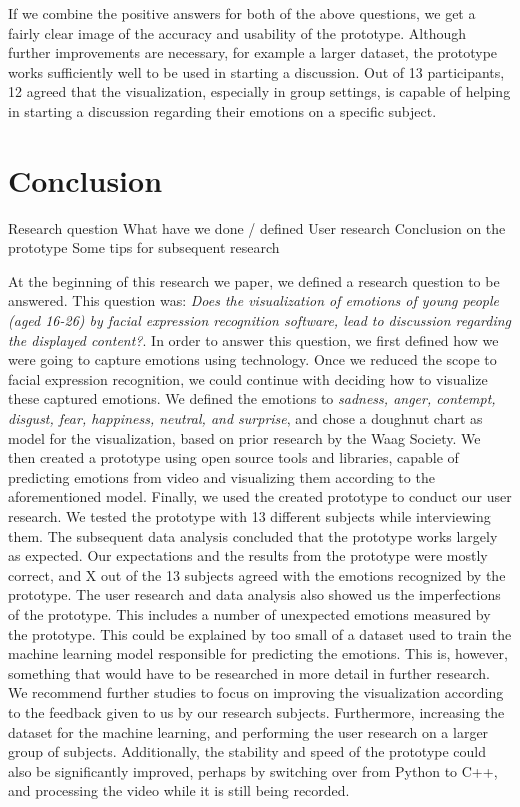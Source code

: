 \documentclass[sigconf]{acmart}
\begin{document}
If we combine the positive answers for both of the above questions, we get a fairly clear image of the accuracy
and usability of the prototype. Although further improvements are necessary, for example a larger dataset,
the prototype works sufficiently well to be used in starting a discussion. Out of 13 participants, 12 agreed that
the visualization, especially in group settings, is capable of helping in starting a discussion regarding their
emotions on a specific subject.


\section{Conclusion}
Research question
What have we done / defined
User research
Conclusion on the prototype
Some tips for subsequent research

At the beginning of this research we paper, we defined a research question to be answered. This question was:
\emph{Does the visualization of emotions of young people (aged 16-26) by facial expression recognition software,
lead to discussion regarding the displayed content?}. In order to answer this question, we first defined how
we were going to capture emotions using technology. Once we reduced the scope to facial expression recognition,
we could continue with deciding how to visualize these captured emotions. We defined the emotions to
\emph{sadness, anger, contempt, disgust, fear, happiness, neutral, and surprise}, and chose a doughnut chart
as model for the visualization, based on prior research by the Waag Society. We then created a prototype
using open source tools and libraries, capable of predicting emotions from video and visualizing them according
to the aforementioned model.
Finally, we used the created prototype to conduct our user research. We tested the prototype with 13 different
subjects while interviewing them. The subsequent data analysis concluded that the prototype works largely as
expected. Our expectations and the results from the prototype were mostly correct, and X out of the 13 subjects
agreed with the emotions recognized by the prototype. The user research and data analysis also showed us the
imperfections of the prototype. This includes a number of unexpected emotions measured by the prototype.
This could be explained by too small of a dataset used to train the machine learning model responsible for
predicting the emotions. This is, however, something that would have to be researched in more detail in further
research.
We recommend further studies to focus on improving the visualization according to the feedback given to us by
our research subjects. Furthermore, increasing the dataset for the machine learning, and performing the user
research on a larger group of subjects. Additionally, the stability and speed of the prototype could also be
significantly improved, perhaps by switching over from Python to C++, and processing the video while it is still
being recorded.
\end{document}
